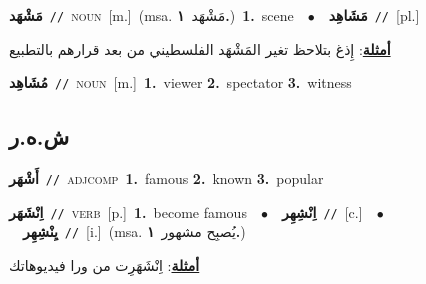 \documentclass[10pt,a4paper,twoside]{article} %
\begin{document}
\begin{multicols}{2}
{\setlength\topsep{0pt}\textbf{\foreignlanguage{arabic}{مَشْهَد}}\ {\color{gray}\texttt{//}\color{black}}\ \textsc{noun}\ [m.]\ \color{gray}(msa. \foreignlanguage{arabic}{مَشْهَد}~\foreignlanguage{arabic}{\textbf{١.}})\color{black}\ \textbf{1.}~scene\ \ $\bullet$\ \ \setlength\topsep{0pt}\textbf{\foreignlanguage{arabic}{مَشَاهِد}}\ {\color{gray}\texttt{//}\color{black}}\ [pl.]\  \begin{flushright}\color{gray}\foreignlanguage{arabic}{\textbf{\underline{\foreignlanguage{arabic}{أمثلة}}}: إِذغ بتلاحظ تغير المَشْهَد الفلسطيني من بعد قرارهم بالتطبيع}\end{flushright}\color{black}} \vspace{2mm}

{\setlength\topsep{0pt}\textbf{\foreignlanguage{arabic}{مُشَاهِد}}\ {\color{gray}\texttt{//}\color{black}}\ \textsc{noun}\ [m.]\ \textbf{1.}~viewer  \textbf{2.}~spectator  \textbf{3.}~witness\ } \vspace{2mm}

\vspace{-3mm}
\subsection*{\color{blue}\foreignlanguage{arabic}{ش.ه.ر}\color{blue}{}} 

{\setlength\topsep{0pt}\textbf{\foreignlanguage{arabic}{أَشْهَر}}\ {\color{gray}\texttt{//}\color{black}}\ \textsc{adj\textunderscore comp}\ \textbf{1.}~famous  \textbf{2.}~known  \textbf{3.}~popular\ } \vspace{2mm}

{\setlength\topsep{0pt}\textbf{\foreignlanguage{arabic}{اِنْشَهَر}}\ {\color{gray}\texttt{//}\color{black}}\ \textsc{verb}\ [p.]\ \textbf{1.}~become famous\ \ $\bullet$\ \ \setlength\topsep{0pt}\textbf{\foreignlanguage{arabic}{اِنْشِهِر}}\ {\color{gray}\texttt{//}\color{black}}\ [c.]\ \ $\bullet$\ \ \setlength\topsep{0pt}\textbf{\foreignlanguage{arabic}{يِنْشِهِر}}\ {\color{gray}\texttt{//}\color{black}}\ [i.]\ \color{gray}(msa. \foreignlanguage{arabic}{يُصبِح مشهور}~\foreignlanguage{arabic}{\textbf{١.}})\color{black}\  \begin{flushright}\color{gray}\foreignlanguage{arabic}{\textbf{\underline{\foreignlanguage{arabic}{أمثلة}}}: اِنْشَهَرِت من ورا فيديوهاتك}\end{flushright}\color{black}} \vspace{2mm}


\end{multicols}
\end{document}
